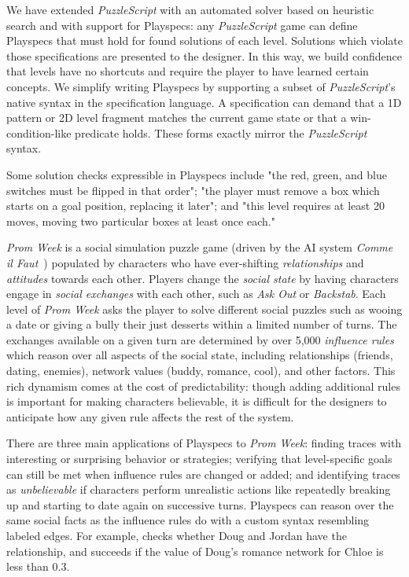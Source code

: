 \documentclass[letterpaper]{article}
\newcommand{\syntax}[1]{\texttt{\detokenize{#1}}}
\begin{document}
We have extended \emph{PuzzleScript} with an automated solver based on heuristic search and with support for Playspecs: any \emph{PuzzleScript} game can define Playspecs that must hold for found solutions of each level. Solutions which violate those specifications are presented to the designer. In this way, we build confidence that levels have no shortcuts and require the player to have learned certain concepts. We simplify writing Playspecs by supporting a subset of \emph{PuzzleScript}'s native syntax in the specification language. A specification can demand that a 1D pattern or 2D level fragment matches the current game state or that a win-condition-like predicate holds. These forms exactly mirror the \emph{PuzzleScript} syntax.

Some solution checks expressible in Playspecs include "the red, green, and blue switches must be flipped in that order"; "the player must remove a box which starts on a goal position, replacing it later"; and "this level requires at least 20 moves, moving two particular boxes at least once each."

\emph{Prom Week} is a social simulation puzzle game (driven by the AI system \emph{Comme il Faut}~\cite{mccoy2014social}) populated by characters who have ever-shifting \emph{relationships} and \emph{attitudes} towards each other. Players change the \emph{social state} by having characters engage in \emph{social exchanges} with each other, such as \emph{Ask Out} or \emph{Backstab}. Each level of \emph{Prom Week} asks the player to solve different social puzzles such as wooing a date or giving a bully their just desserts within a limited number of turns. The exchanges available on a given turn are determined by over 5,000 \emph{influence rules} which reason over all aspects of the social state, including relationships (friends, dating, enemies), network values (buddy, romance, cool), and other factors. This rich dynamism comes at the cost of predictability: though adding additional rules is important for making characters believable, it is difficult for the designers to anticipate how any given rule affects the rest of the system. 

There are three main applications of Playspecs to \emph{Prom Week}: finding traces with interesting or surprising behavior or strategies; verifying that level-specific goals can still be met when influence rules are changed or added; and identifying traces as \emph{unbelievable} if characters perform unrealistic actions like repeatedly breaking up and starting to date again on successive turns. Playspecs can reason over the same social facts as the influence rules do with a custom syntax resembling labeled edges. For example, \syntax{Doug-friends-Jordan} checks whether Doug and Jordan have the \syntax{friends} relationship, and \syntax{Doug-romance<0.3-Chloe} succeeds if the value of Doug's romance network for Chloe is less than $0.3$.
\end{document}
